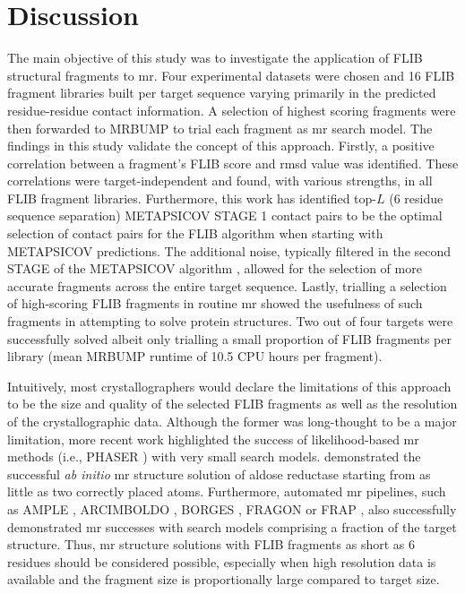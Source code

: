 \section{Discussion}
The main objective of this study was to investigate the application of FLIB structural fragments to \gls{mr}. Four experimental datasets were chosen and 16 FLIB fragment libraries built per target sequence varying primarily in the predicted residue-residue contact information. A selection of highest scoring fragments were then forwarded to MRBUMP to trial each fragment as \gls{mr} search model. The findings in this study validate the concept of this approach. Firstly, a positive correlation between a fragment's FLIB score and \gls{rmsd} value was identified. These correlations were target-independent and found, with various strengths, in all FLIB fragment libraries. Furthermore, this work has identified top-$L$ (6 residue sequence separation) METAPSICOV STAGE 1 contact pairs to be the optimal selection of contact pairs for the FLIB algorithm when starting with METAPSICOV predictions. The additional noise, typically filtered in the second STAGE of the METAPSICOV algorithm \cite{Jones2015-vq}, allowed for the selection of more accurate fragments across the entire target sequence. Lastly, trialling a selection of high-scoring FLIB fragments in routine \gls{mr} showed the usefulness of such fragments in attempting to solve protein structures. Two out of four targets were successfully solved albeit only trialling a small proportion of FLIB fragments per library (mean MRBUMP runtime of 10.5 CPU hours per fragment).

Intuitively, most crystallographers would declare the limitations of this approach to be the size and quality of the selected FLIB fragments as well as the resolution of the crystallographic data. Although the former was long-thought to be a major limitation, more recent work highlighted the success of likelihood-based \gls{mr} methods (i.e., PHASER \cite{McCoy2007-mp}) with very small search models. \textcite{McCoy2017-cz} demonstrated the successful \textit{ab initio} \gls{mr} structure solution of aldose reductase starting from as little as two correctly placed atoms. Furthermore, automated \gls{mr} pipelines, such as AMPLE \cite{Bibby2012-lm}, ARCIMBOLDO \cite{Rodriguez2012-ad}, BORGES \cite{Sammito2013-ug}, FRAGON \cite{Jenkins2018-gf} or FRAP \cite{Shrestha2015-zb}, also successfully demonstrated \gls{mr} successes with search models comprising a fraction of the target structure. Thus, \gls{mr} structure solutions with FLIB fragments as short as 6 residues should be considered possible, especially when high resolution data is available and the fragment size is proportionally large compared to target size.

